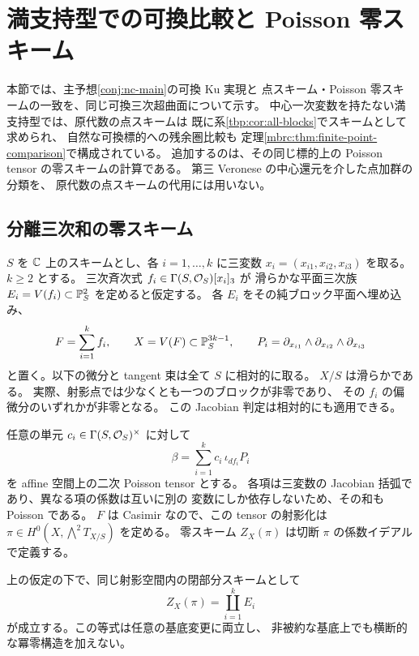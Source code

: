 \section{満支持型での可換比較と Poisson 零スキーム}
\label{pps:sec:split}

本節では、主予想\ref{conj:nc-main}の可換 Ku 実現と
点スキーム・Poisson 零スキームの一致を、同じ可換三次超曲面について示す。
中心一次変数を持たない満支持型では、原代数の点スキームは
既に系\ref{tbp:cor:all-blocks}でスキームとして求められ、
自然な可換標的への残余圏比較も
定理\ref{mbrc:thm:finite-point-comparison}で構成されている。
追加するのは、その同じ標的上の Poisson tensor の零スキームの計算である。
第三 Veronese の中心還元を介した点加群の分類を、
原代数の点スキームの代用には用いない。

\subsection{分離三次和の零スキーム}

$S$ を $\mathbb C$ 上のスキームとし、各 $i=1,\ldots,k$ に三変数
$x_i=(x_{i1},x_{i2},x_{i3})$ を取る。$k\ge2$ とする。
三次斉次式 $f_i\in\Gamma(S,\mathcal O_S)[x_i]_3$ が
滑らかな平面三次族 $E_i=V(f_i)\subset\mathbb P^2_S$ を定めると仮定する。
各 $E_i$ をその純ブロック平面へ埋め込み、
\begin{equation}\label{pps:eq:split-data}
 F=\sum_{i=1}^k f_i,\qquad
 X=V(F)\subset\mathbb P^{3k-1}_S,\qquad
 P_i=\partial_{x_{i1}}\wedge\partial_{x_{i2}}\wedge\partial_{x_{i3}}
\end{equation}
と置く。以下の微分と tangent 束は全て $S$ に相対的に取る。
$X/S$ は滑らかである。
実際、射影点では少なくとも一つのブロックが非零であり、
その $f_i$ の偏微分のいずれかが非零となる。
この Jacobian 判定は相対的にも適用できる。

任意の単元 $c_i\in\Gamma(S,\mathcal O_S)^\times$ に対して
\begin{equation}\label{pps:eq:poisson-tensor}
 \beta=\sum_{i=1}^k c_i\,\iota_{df_i}P_i
\end{equation}
を affine 空間上の二次 Poisson tensor とする。
各項は三変数の Jacobian 括弧であり、異なる項の係数は互いに別の
変数にしか依存しないため、その和も Poisson である。
$F$ は Casimir なので、この tensor の射影化は
$\pi\in H^0(X,\bigwedge^2T_{X/S})$ を定める。
零スキーム $Z_X(\pi)$ は切断 $\pi$ の係数イデアルで定義する。

\begin{proposition}
\label{pps:prop:zero-scheme}
上の仮定の下で、同じ射影空間内の閉部分スキームとして
\begin{equation}\label{pps:eq:zero-scheme}
 Z_X(\pi)=\coprod_{i=1}^k E_i
\end{equation}
が成立する。この等式は任意の基底変更に両立し、
非被約な基底上でも横断的な冪零構造を加えない。
\end{proposition}


